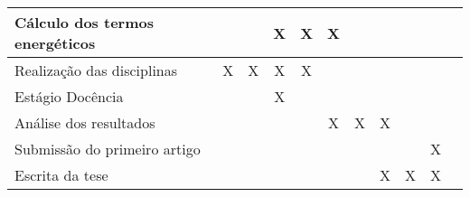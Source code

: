 \documentclass[portuguese,12pt,a4paper]{article}
\begin{document}
\begin{table}[H]
\begin{adjustbox}{width=1\textwidth}
\begin{tabular}{|l|cccc|ccccc|c|}
		Cálculo dos termos energéticos & \multicolumn{1}{c|}{}                          & \multicolumn{1}{c|}{}                          & \multicolumn{1}{c|}{\cellcolor[HTML]{C0C0C0}X} & X                     & \multicolumn{1}{c|}{X}                     & \multicolumn{1}{c|}{}                      & \multicolumn{1}{c|}{}                      & \multicolumn{1}{c|}{}                      &                       &                       \\ \hline
		Realização das disciplinas     & \multicolumn{1}{c|}{\cellcolor[HTML]{9B9B9B}X} & \multicolumn{1}{c|}{\cellcolor[HTML]{9B9B9B}X} & \multicolumn{1}{c|}{\cellcolor[HTML]{C0C0C0}X} & X                     & \multicolumn{1}{c|}{}                      & \multicolumn{1}{c|}{}                      & \multicolumn{1}{c|}{}                      & \multicolumn{1}{c|}{}                      &                       &                       \\ \hline
		Estágio Docência               & \multicolumn{1}{c|}{}                          & \multicolumn{1}{c|}{}                          & \multicolumn{1}{c|}{\cellcolor[HTML]{C0C0C0}X} &                       & \multicolumn{1}{c|}{}                      & \multicolumn{1}{c|}{}                      & \multicolumn{1}{c|}{}                      & \multicolumn{1}{c|}{}                      &                       &                       \\ \hline
		Análise dos resultados         & \multicolumn{1}{c|}{}                          & \multicolumn{1}{c|}{}                          & \multicolumn{1}{c|}{}                          &                       & \multicolumn{1}{c|}{X}                     & \multicolumn{1}{c|}{X}                     & \multicolumn{1}{c|}{X}                     & \multicolumn{1}{c|}{}                      &                       &                       \\ \hline
		Submissão do primeiro artigo   & \multicolumn{1}{c|}{}                          & \multicolumn{1}{c|}{}                          & \multicolumn{1}{c|}{}                          &                       & \multicolumn{1}{c|}{}                      & \multicolumn{1}{c|}{}                      & \multicolumn{1}{c|}{}                      & \multicolumn{1}{c|}{}                      & X                     &                       \\ \hline
		Escrita da tese                & \multicolumn{1}{c|}{}                          & \multicolumn{1}{c|}{}                          & \multicolumn{1}{c|}{}                          &                       & \multicolumn{1}{c|}{}                      & \multicolumn{1}{c|}{}                      & \multicolumn{1}{c|}{X}                     & \multicolumn{1}{c|}{X}                     & X                     &                       \\ \hline

\end{tabular}
\end{adjustbox}
\end{table}
\end{document}

